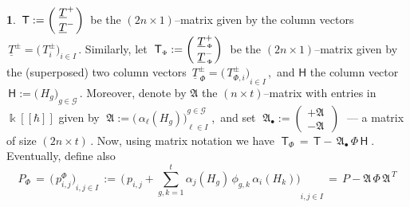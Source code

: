 \documentclass[12pt,reqno,twoside,a4paper]{amsart}
\numberwithin{equation}{section}
\theoremstyle{definition}
\newtheorem{free text}[lema]{}
\theoremstyle{remark}
\newcommand{\G}{{\mathcal G}}
\def \kh{{\Bbbk[[\hbar]]}}
\def \G {\mathcal{G}}
\newcommand\fT{\mathsf{T}}
\newcommand\fH{\mathsf{H}}
\theoremstyle{plain}
\begin{document}
\begin{free text}
%
 $ \, \fT := \bigg(\, {\displaystyle {\underline{T}^+ \atop \underline{T}^-}} \bigg) \, $
%
 be the  $ (2n \times 1) $--matrix  given by the column vectors
%
 $ \, \underline{T}^\pm = {\big(\, T_i^\pm \big)}_{i \in I} \, $.  Similarly, let
%
 $ \; \fT_{{\scriptscriptstyle \Phi}} :=
 \bigg(\, {\displaystyle {\underline{T}^+_{\,\scriptscriptstyle \Phi} \atop \underline{T}^-_{\,\scriptscriptstyle \Phi}} }\bigg) \; $
%
 be the  $ (2n \times 1) $--matrix  given by the (superposed) two column vectors
 $ \, \underline{T}^\pm_{\,\scriptscriptstyle \Phi} = {\big(\, T_{{\scriptscriptstyle \Phi}, i}^\pm \big)}_{i \in I} \, $,
 \,and  $ \fH $  the column vector  $ \, \fH := {\big(\, H_g \big)}_{g \in \G} \, $.
 Moreover, denote by  $ \mathfrak{A} $  the  $ (n \times t) $--matrix  with entries in  $ \kh $  given by
 $ \; \mathfrak{A} := {\big(\, \alpha_\ell(H_g) \big)}_{\ell \in I}^{g \in \G} \; $,  \,and set
 $ \; \mathfrak{A}_\bullet  :=  \begin{pmatrix}
        +\mathfrak{A} \,  \\
        -\mathfrak{A} \,
                        \end{pmatrix} \; $
 --- a matrix of size  $ (2n \times t) \, $.
%
 \vskip3pt
%
   Now, using matrix notation we have
%
  $ \; \fT_{\scriptscriptstyle \Phi} \, = \, \fT - \, \mathfrak{A}_\bullet \, \Phi \, \fH \; $.
%
 Eventually, define also
%
\begin{equation}  \label{def-P_Phi}
  P_{\scriptscriptstyle \Phi} \, =
   \, {\big(\, p^{\scriptscriptstyle \Phi}_{i,j} \big)}_{i, j \in I} \, :=
   \, {\Big(\, p_{i,j} + {\textstyle \sum_{g,k=1}^t} \alpha_j(H_g) \, \phi_{g,k} \, \alpha_i(H_k) \Big)}_{i, j \in I} \, =
   \, P - \mathfrak{A} \, \Phi \, \mathfrak{A}^{\,\scriptscriptstyle T}
\end{equation}

\vskip5pt


\end{free text}
\end{document}
